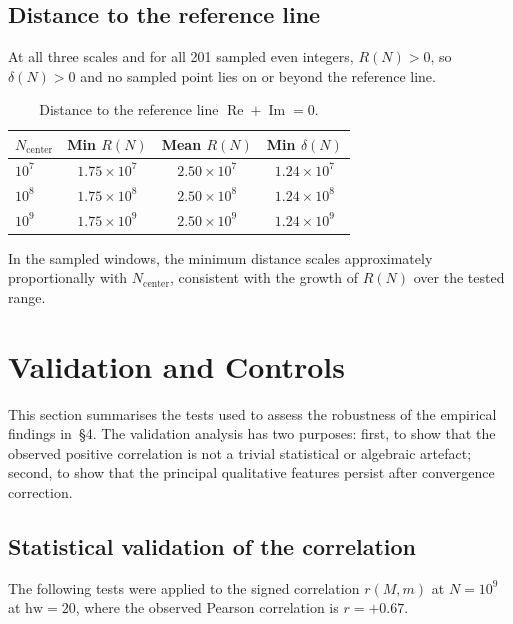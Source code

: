 \documentclass[11pt,a4paper]{article}
\newcommand{\RN}{R(N)}
\begin{document}
\subsection{Distance to the reference line}

At all three scales and for all 201 sampled even integers, $\RN > 0$, so $\delta(N) > 0$ and no sampled point lies on or beyond the reference line.

\begin{table}[h]
\centering
\begin{tabular}{l ccc}
\toprule
$N_{\mathrm{center}}$ & Min $\RN$ & Mean $\RN$ & Min $\delta(N)$ \\
\midrule
$10^7$ & $1.75 \times 10^7$ & $2.50 \times 10^7$ & $1.24 \times 10^7$ \\
$10^8$ & $1.75 \times 10^8$ & $2.50 \times 10^8$ & $1.24 \times 10^8$ \\
$10^9$ & $1.75 \times 10^9$ & $2.50 \times 10^9$ & $1.24 \times 10^9$ \\
\bottomrule
\end{tabular}
\caption{Distance to the reference line $\operatorname{Re}+\operatorname{Im}=0$.}
\label{tab:distance}
\end{table}

In the sampled windows, the minimum distance scales approximately proportionally with $N_{\mathrm{center}}$, consistent with the growth of $\RN$ over the tested range.



\section{Validation and Controls}

This section summarises the tests used to assess the robustness of the empirical findings in~\S4. The validation analysis has two purposes: first, to show that the observed positive correlation is not a trivial statistical or algebraic artefact; second, to show that the principal qualitative features persist after convergence correction.


\subsection{Statistical validation of the correlation}

The following tests were applied to the signed correlation $r(M,m)$ at $N = 10^9$ at $\mathrm{hw} = 20$, where the observed Pearson correlation is $r = +0.67$.
\end{document}
